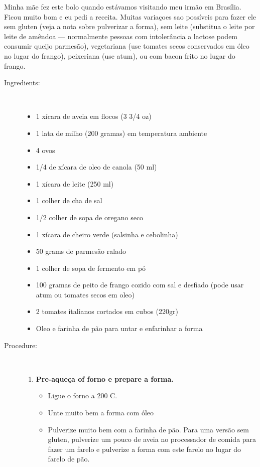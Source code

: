 \documentclass[11pt,letterpaper]{article}
\begin{document}


Minha m\~ae fez este bolo quando est\'avamos visitando meu irm\~ao em Bras\'ilia. Ficou muito bom e eu pedi a receita. Muitas varia\c{c}oes sao poss\'iveis para fazer ele sem gluten (veja a nota sobre pulverizar a forma), sem leite (substitua o leite por leite de am\^endoa --- normalmente pessoas com intoler\^ancia a lactose podem consumir queijo parmes\~ao),  vegetariana (use tomates secos conservados em \'oleo no lugar do frango), peixeriana (use atum), ou com bacon frito no lugar do frango.
 
\begin{description}

\item[Ingredients:]\ \\
	\begin{itemize}
	\item 1 x\'icara de aveia em flocos (3 3/4 oz)
	\item 1 lata de milho (200 gramas) em temperatura ambiente
	\item 4 ovos
	\item 1/4 de x\'icara de oleo de canola (50 ml)
	\item 1 x\'icara de leite (250 ml)
	\item 1 colher de cha de sal
	\item 1/2 colher de sopa de oregano seco
	\item 1 x\'icara de cheiro verde (salsinha e cebolinha)
	\item 50 grams de parmes\~ao ralado
	\item 1 colher de sopa de fermento em p\'o
	\item 100 gramas de peito de frango cozido com sal e desfiado (pode usar atum ou tomates secos em oleo)
	\item 2 tomates italianos cortados em cubos (220gr)
	\item Oleo e farinha de p\~ao para untar e enfarinhar a forma
	\end{itemize}

\item[Procedure:]\ \\
	\begin{enumerate}
	\item {\bf Pre-aque\c{c}a of forno e prepare a forma.}
	\begin{itemize}
	\item Ligue o forno a 200 C.
	\item Unte muito bem a forma com \'oleo
	\item Pulverize muito bem com a farinha de p\~ao. Para uma vers\~ao sem gluten, pulverize um pouco de aveia no processador de comida para fazer um farelo e pulverize a forma com este farelo no lugar do farelo de p\~ao.
	\end{itemize}
	

\end{enumerate}
\end{description}
\end{document}
